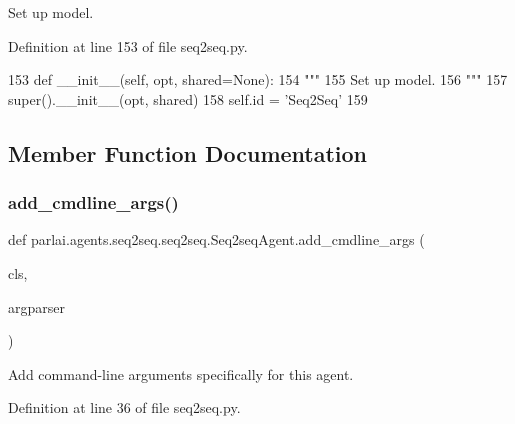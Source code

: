 \begin{DoxyVerb}Set up model.
\end{DoxyVerb}
 

Definition at line 153 of file seq2seq.\+py.


\begin{DoxyCode}
153     \textcolor{keyword}{def }\_\_init\_\_(self, opt, shared=None):
154         \textcolor{stringliteral}{"""}
155 \textcolor{stringliteral}{        Set up model.}
156 \textcolor{stringliteral}{        """}
157         super().\_\_init\_\_(opt, shared)
158         self.id = \textcolor{stringliteral}{'Seq2Seq'}
159 
\end{DoxyCode}


\subsection{Member Function Documentation}
\mbox{\label{classparlai_1_1agents_1_1seq2seq_1_1seq2seq_1_1Seq2seqAgent_a1287bfcdb2072a431bbbd513c36043a9}} 
\subsubsection{\texorpdfstring{add\+\_\+cmdline\+\_\+args()}{add\_cmdline\_args()}}
{\footnotesize\ttfamily def parlai.\+agents.\+seq2seq.\+seq2seq.\+Seq2seq\+Agent.\+add\+\_\+cmdline\+\_\+args (\begin{DoxyParamCaption}\item[{}]{cls,  }\item[{}]{argparser }\end{DoxyParamCaption})}

\begin{DoxyVerb}Add command-line arguments specifically for this agent.
\end{DoxyVerb}
 

Definition at line 36 of file seq2seq.\+py.


